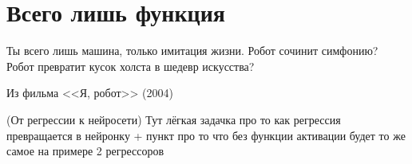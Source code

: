 \documentclass[12pt, a4paper, oneside]{article}
\theoremstyle{plain} %
\theoremstyle{definition}
\begin{document}
\tableofcontents

	
\section{Всего лишь функция} 

\epigraph{Ты всего лишь машина, только имитация жизни. Робот сочинит симфонию? Робот превратит кусок холста в шедевр искусства?}{Из фильма <<Я, робот>> (2004)}

\begin{problem}{(От регрессии к нейросети)}
Тут лёгкая задачка про то как регрессия превращается в нейронку + пункт про то что без функции активации будет то же самое на примере 2 регрессоров
\end{problem}
\end{document}
